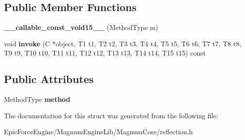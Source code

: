 \subsection*{Public Member Functions}
\begin{DoxyCompactItemize}
\item 
{\bfseries \+\_\+\+\_\+callable\+\_\+const\+\_\+void15\+\_\+\+\_\+} (Method\+Type m)\hypertarget{structagm_1_1reflection_1_1____callable__const__void15_____ada8fc9849e3719a9098c70dc00bf21aa}{}\label{structagm_1_1reflection_1_1____callable__const__void15_____ada8fc9849e3719a9098c70dc00bf21aa}

\item 
void {\bfseries invoke} (C $\ast$object, T1 t1, T2 t2, T3 t3, T4 t4, T5 t5, T6 t6, T7 t7, T8 t8, T9 t9, T10 t10, T11 t11, T12 t12, T13 t13, T14 t14, T15 t15) const \hypertarget{structagm_1_1reflection_1_1____callable__const__void15_____a7f37b42b186ebf54460d8a1253e06c13}{}\label{structagm_1_1reflection_1_1____callable__const__void15_____a7f37b42b186ebf54460d8a1253e06c13}

\end{DoxyCompactItemize}
\subsection*{Public Attributes}
\begin{DoxyCompactItemize}
\item 
Method\+Type {\bfseries method}\hypertarget{structagm_1_1reflection_1_1____callable__const__void15_____a95d1f88ccbc47d9fdbec74a10401921d}{}\label{structagm_1_1reflection_1_1____callable__const__void15_____a95d1f88ccbc47d9fdbec74a10401921d}

\end{DoxyCompactItemize}


The documentation for this struct was generated from the following file\+:\begin{DoxyCompactItemize}
\item 
Epic\+Force\+Engine/\+Magnum\+Engine\+Lib/\+Magnum\+Core/reflection.\+h\end{DoxyCompactItemize}
